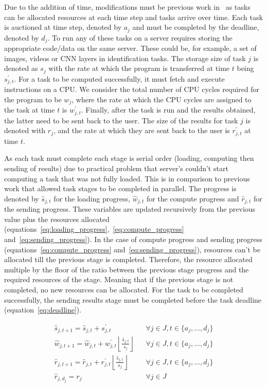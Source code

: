 Due to the addition of time, modifications must be previous work in~\cite{FlexibleResourceAllocation} as tasks can
be allocated resources at each time step and tasks arrive over time.
Each task is auctioned at time step, denoted by $a_j$ and must be completed by the deadline, denoted by $d_j$.
To run any of these tasks on a server requires storing the appropriate code/data on the same server. These could be,
for example, a set of images, videos or CNN layers in identification tasks. The storage size of task $j$ is denoted
as $s_j$ with the rate at which the program is transferred at time $t$ being $s^{'}_{j,t}$. For a task to be computed
successfully, it must fetch and execute instructions on a CPU. We consider the total number of CPU cycles required
for the program to be $w_j$, where the rate at which the CPU cycles are assigned to the task at time $t$ is
$w^{'}_{j,t}$. Finally, after the task is run and the results obtained, the latter need to be sent back to the user.
The size of the results for task $j$ is denoted with $r_j$, and the rate at which they are sent back to the user
is $r^{'}_{j,t}$ at time $t$.

As each task must complete each stage is serial order (loading, computing then sending of
results) due to practical problem that server's couldn't start computing a task that was not fully loaded. This is in
comparison to previous work that allowed task stages to be completed in parallel. The progress is denoted by
$\hat{s}_{j,t}$ for the loading progress, $\hat{w}_{j,t}$ for the compute progress and $\hat{r}_{j,t}$ for the sending
progress. These variables are updated recursively from the previous value plus the resources allocated
(equations~\ref{eq:loading_progress},~\ref{eq:compute_progress} and~\ref{eq:sending_progress}). In the case of compute
progress and sending progress (equations~\ref{eq:compute_progress} and~\ref{eq:sending_progress}), resources can't be
allocated till the previous stage is completed. Therefore, the resource allocated multiple by the floor of the ratio
between the previous stage progress and the required resources of the stage. Meaning that if the previous stage is not
completed, no new resources can be allocated. For the task to be completed successfully, the sending results stage
must be completed before the task deadline (equation~\ref{eq:deadline}).

\begin{align}
    \hat{s}_{j,t+1} = \hat{s}_{j,t} + s^{'}_{j,t} &&
        \forall{j \in J, t \in \{a_j, \dots, d_j\}} \label{eq:loading_progress} \\
    \hat{w}_{j,t+1} = \hat{w}_{j,t} + w^{'}_{j,t} \left \lfloor{\frac{\hat{s}_{j,t}}{s_j}}\right \rfloor &&
        \forall{j \in J, t \in \{a_j, \dots, d_j\}} \label{eq:compute_progress} \\
    \hat{r}_{j,t+1} = \hat{r}_{j,t} + r^{'}_{j,t} \left \lfloor{\frac{\hat{s}_{j,t}}{s_j}}\right \rfloor &&
        \forall{j \in J, t \in \{a_j, \dots, d_j\}} \label{eq:sending_progress} \\

    \hat{r}_{j,d_j} = r_j && \forall{j \in J} \label{eq:deadline} \\
\end{align}

